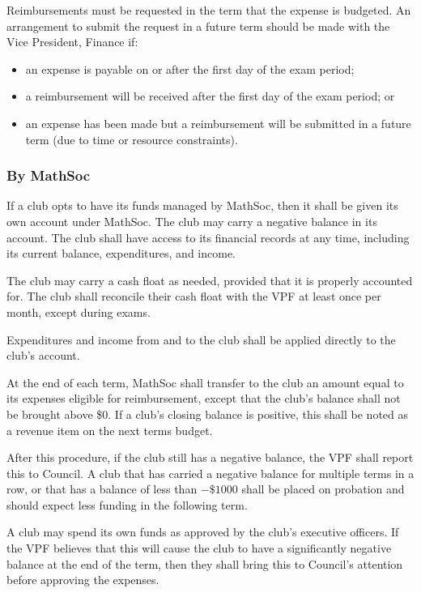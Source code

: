 Reimbursements must be requested in the term that the expense is budgeted. 
An arrangement to submit the request in a future term should be made with
the Vice President, Finance if:
\begin{itemize}
	\item an expense is payable on or after the first day of the exam period;
	\item a reimbursement will be received after the first day of the exam period; or
	\item an expense has been made but a reimbursement will be submitted in a 
	future term (due to time or resource constraints).
\end{itemize}

\subsubsection{By MathSoc} 
If a club opts to have its funds managed by MathSoc, then it shall be given its
own account under MathSoc. The club may carry a negative balance in its account.
The club shall have access to its financial records at any time, including its
current balance, expenditures, and income.

The club may carry a cash float as needed, provided that it is properly
accounted for. The club shall reconcile their cash float with the VPF at least
once per month, except during exams.

Expenditures and income from and to the club shall be applied directly to the
club's account.

At the end of each term, MathSoc shall transfer to the club an amount equal to
its expenses eligible for reimbursement, except that the club's balance shall
not be brought above \$0. If a club's closing balance is positive, this shall
be noted as a revenue item on the next terms budget.

After this procedure, if the club still has a negative balance, the VPF shall
report this to Council. A club that has carried a negative balance for multiple
terms in a row, or that has a balance of less than $-\$1000$ shall be placed on
probation and should expect less funding in the following term.

A club may spend its own funds as approved by the club's executive officers. If
the VPF believes that this will cause the club to have a significantly negative
balance at the end of the term, then they shall bring this to Council's
attention before approving the expenses.

